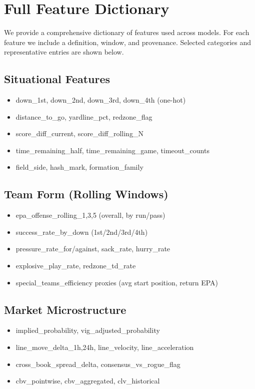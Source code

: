 \section{Full Feature Dictionary}\label{app:feature-dict}
We provide a comprehensive dictionary of features used across models. For each feature we include a definition, window, and provenance. Selected categories and representative entries are shown below.

\subsection{Situational Features}
\begin{itemize}
  \item down\_1st, down\_2nd, down\_3rd, down\_4th (one-hot)
  \item distance\_to\_go, yardline\_pct, redzone\_flag
  \item score\_diff\_current, score\_diff\_rolling\_N
  \item time\_remaining\_half, time\_remaining\_game, timeout\_counts
  \item field\_side, hash\_mark, formation\_family
\end{itemize}

\subsection{Team Form (Rolling Windows)}
\begin{itemize}
  \item epa\_offense\_rolling\_{1,3,5} (overall, by run/pass)
  \item success\_rate\_by\_down (1st/2nd/3rd/4th)
  \item pressure\_rate\_for/against, sack\_rate, hurry\_rate
  \item explosive\_play\_rate, redzone\_td\_rate
  \item special\_teams\_efficiency proxies (avg start position, return EPA)
\end{itemize}

\subsection{Market Microstructure}
\begin{itemize}
  \item implied\_probability, vig\_adjusted\_probability
  \item line\_move\_delta\_{1h,24h}, line\_velocity, line\_acceleration
  \item cross\_book\_spread\_delta, consensus\_vs\_rogue\_flag
  \item cbv\_pointwise, cbv\_aggregated, clv\_historical
\end{itemize}

